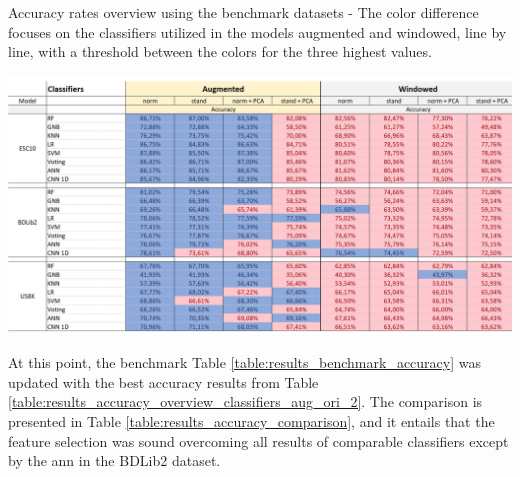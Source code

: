 \begin{table}[ht!]
    \caption[Accuracy rates overview using the benchmark datasets - Models augmented x windowed (Focus on the classifiers line by line)]{Accuracy rates overview using the benchmark datasets - The color difference focuses on the classifiers utilized in the models augmented and windowed, line by line, with a threshold between the colors for the three highest values.}
    \label{table:results_accuracy_overview_features_windowed}
     \raggedright
    \includegraphics[width=1\textwidth]{resources/images/060-results/Results_classification_overview_aug_x_ori_3.png}
\end{table}

At this point, the benchmark Table \ref{table:results_benchmark_accuracy} was updated with the best accuracy results from Table \ref{table:results_accuracy_overview_classifiers_aug_ori_2}. The comparison is presented in Table \ref{table:results_accuracy_comparison}, and it entails that the feature selection was sound overcoming all results of comparable classifiers except by the \gls{ann} in the BDLib2 dataset.

